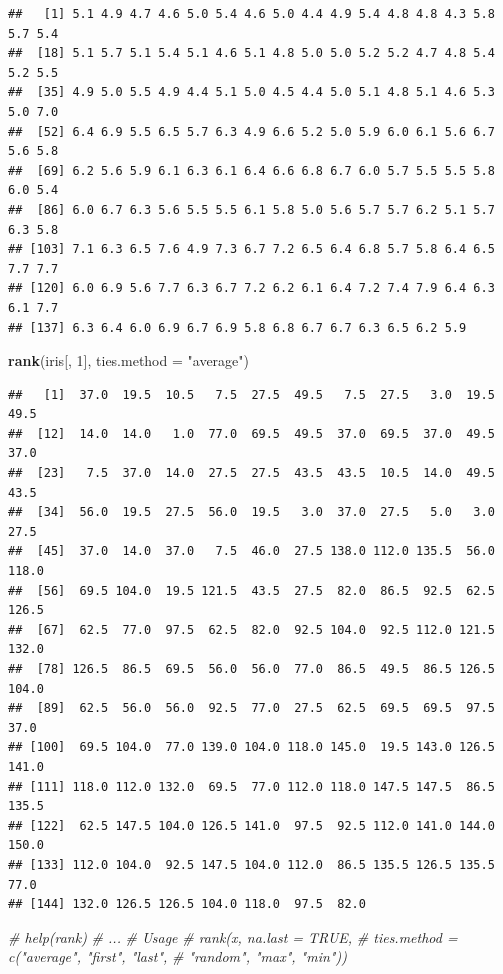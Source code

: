 \documentclass[]{book}
\newenvironment{Shaded}{\begin{snugshade}}{\end{snugshade}}
\newcommand{\KeywordTok}[1]{\textcolor[rgb]{0.13,0.29,0.53}{\textbf{#1}}}
\newcommand{\DataTypeTok}[1]{\textcolor[rgb]{0.13,0.29,0.53}{#1}}
\newcommand{\DecValTok}[1]{\textcolor[rgb]{0.00,0.00,0.81}{#1}}
\newcommand{\StringTok}[1]{\textcolor[rgb]{0.31,0.60,0.02}{#1}}
\newcommand{\CommentTok}[1]{\textcolor[rgb]{0.56,0.35,0.01}{\textit{#1}}}
\newcommand{\NormalTok}[1]{#1}
\begin{document}
\begin{verbatim}
##   [1] 5.1 4.9 4.7 4.6 5.0 5.4 4.6 5.0 4.4 4.9 5.4 4.8 4.8 4.3 5.8 5.7 5.4
##  [18] 5.1 5.7 5.1 5.4 5.1 4.6 5.1 4.8 5.0 5.0 5.2 5.2 4.7 4.8 5.4 5.2 5.5
##  [35] 4.9 5.0 5.5 4.9 4.4 5.1 5.0 4.5 4.4 5.0 5.1 4.8 5.1 4.6 5.3 5.0 7.0
##  [52] 6.4 6.9 5.5 6.5 5.7 6.3 4.9 6.6 5.2 5.0 5.9 6.0 6.1 5.6 6.7 5.6 5.8
##  [69] 6.2 5.6 5.9 6.1 6.3 6.1 6.4 6.6 6.8 6.7 6.0 5.7 5.5 5.5 5.8 6.0 5.4
##  [86] 6.0 6.7 6.3 5.6 5.5 5.5 6.1 5.8 5.0 5.6 5.7 5.7 6.2 5.1 5.7 6.3 5.8
## [103] 7.1 6.3 6.5 7.6 4.9 7.3 6.7 7.2 6.5 6.4 6.8 5.7 5.8 6.4 6.5 7.7 7.7
## [120] 6.0 6.9 5.6 7.7 6.3 6.7 7.2 6.2 6.1 6.4 7.2 7.4 7.9 6.4 6.3 6.1 7.7
## [137] 6.3 6.4 6.0 6.9 6.7 6.9 5.8 6.8 6.7 6.7 6.3 6.5 6.2 5.9
\end{verbatim}

\begin{Shaded}
\begin{Highlighting}[]
\KeywordTok{rank}\NormalTok{(iris[, }\DecValTok{1}\NormalTok{], }\DataTypeTok{ties.method =} \StringTok{"average"}\NormalTok{)}
\end{Highlighting}
\end{Shaded}

\begin{verbatim}
##   [1]  37.0  19.5  10.5   7.5  27.5  49.5   7.5  27.5   3.0  19.5  49.5
##  [12]  14.0  14.0   1.0  77.0  69.5  49.5  37.0  69.5  37.0  49.5  37.0
##  [23]   7.5  37.0  14.0  27.5  27.5  43.5  43.5  10.5  14.0  49.5  43.5
##  [34]  56.0  19.5  27.5  56.0  19.5   3.0  37.0  27.5   5.0   3.0  27.5
##  [45]  37.0  14.0  37.0   7.5  46.0  27.5 138.0 112.0 135.5  56.0 118.0
##  [56]  69.5 104.0  19.5 121.5  43.5  27.5  82.0  86.5  92.5  62.5 126.5
##  [67]  62.5  77.0  97.5  62.5  82.0  92.5 104.0  92.5 112.0 121.5 132.0
##  [78] 126.5  86.5  69.5  56.0  56.0  77.0  86.5  49.5  86.5 126.5 104.0
##  [89]  62.5  56.0  56.0  92.5  77.0  27.5  62.5  69.5  69.5  97.5  37.0
## [100]  69.5 104.0  77.0 139.0 104.0 118.0 145.0  19.5 143.0 126.5 141.0
## [111] 118.0 112.0 132.0  69.5  77.0 112.0 118.0 147.5 147.5  86.5 135.5
## [122]  62.5 147.5 104.0 126.5 141.0  97.5  92.5 112.0 141.0 144.0 150.0
## [133] 112.0 104.0  92.5 147.5 104.0 112.0  86.5 135.5 126.5 135.5  77.0
## [144] 132.0 126.5 126.5 104.0 118.0  97.5  82.0
\end{verbatim}

\begin{Shaded}
\begin{Highlighting}[]
\CommentTok{# help(rank)}
\CommentTok{# ...}
\CommentTok{# Usage}
\CommentTok{# rank(x, na.last = TRUE,}
\CommentTok{#     ties.method = c("average", "first", "last", }
\CommentTok{#       "random", "max", "min"))}
\end{Highlighting}
\end{Shaded}
\end{document}
